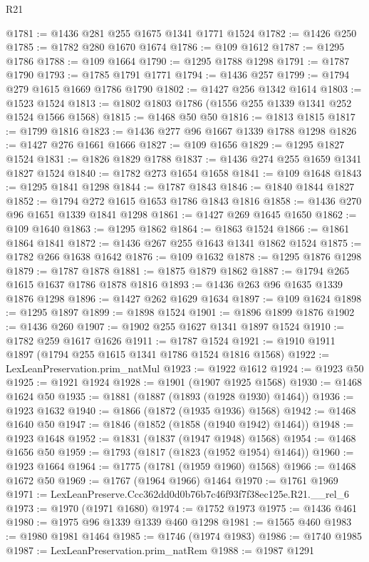 \begin{lexlean}{R21}
\begin{coremodule}
@1781 := @1436 @281 @255 @1675 @1341 @1771 @1524
@1782 := @1426 @250
@1785 := @1782 @280 @1670 @1674
@1786 := @109 @1612
@1787 := @1295 @1786
@1788 := @109 @1664
@1790 := @1295 @1788 @1298
@1791 := @1787 @1790
@1793 := @1785 @1791 @1771
@1794 := @1436 @257
@1799 := @1794 @279 @1615 @1669 @1786 @1790
@1802 := @1427 @256 @1342 @1614
@1803 := @1523 @1524
@1813 := @1802 @1803 @1786 (@1556 @255 @1339 @1341 @252 @1524 @1566 @1568)
@1815 := @1468 @50 @50
@1816 := @1813 @1815
@1817 := @1799 @1816
@1823 := @1436 @277 @96 @1667 @1339 @1788 @1298
@1826 := @1427 @276 @1661 @1666
@1827 := @109 @1656
@1829 := @1295 @1827 @1524
@1831 := @1826 @1829 @1788
@1837 := @1436 @274 @255 @1659 @1341 @1827 @1524
@1840 := @1782 @273 @1654 @1658
@1841 := @109 @1648
@1843 := @1295 @1841 @1298
@1844 := @1787 @1843
@1846 := @1840 @1844 @1827
@1852 := @1794 @272 @1615 @1653 @1786 @1843 @1816
@1858 := @1436 @270 @96 @1651 @1339 @1841 @1298
@1861 := @1427 @269 @1645 @1650
@1862 := @109 @1640
@1863 := @1295 @1862
@1864 := @1863 @1524
@1866 := @1861 @1864 @1841
@1872 := @1436 @267 @255 @1643 @1341 @1862 @1524
@1875 := @1782 @266 @1638 @1642
@1876 := @109 @1632
@1878 := @1295 @1876 @1298
@1879 := @1787 @1878
@1881 := @1875 @1879 @1862
@1887 := @1794 @265 @1615 @1637 @1786 @1878 @1816
@1893 := @1436 @263 @96 @1635 @1339 @1876 @1298
@1896 := @1427 @262 @1629 @1634
@1897 := @109 @1624
@1898 := @1295 @1897
@1899 := @1898 @1524
@1901 := @1896 @1899 @1876
@1902 := @1436 @260
@1907 := @1902 @255 @1627 @1341 @1897 @1524
@1910 := @1782 @259 @1617 @1626
@1911 := @1787 @1524
@1921 := @1910 @1911 @1897 (@1794 @255 @1615 @1341 @1786 @1524 @1816 @1568)
@1922 := LexLeanPreservation.prim_natMul
@1923 := @1922 @1612
@1924 := @1923 @50
@1925 := @1921 @1924
@1928 := @1901 (@1907 @1925 @1568)
@1930 := @1468 @1624 @50
@1935 := @1881 (@1887 (@1893 (@1928 @1930) @1464))
@1936 := @1923 @1632
@1940 := @1866 (@1872 (@1935 @1936) @1568)
@1942 := @1468 @1640 @50
@1947 := @1846 (@1852 (@1858 (@1940 @1942) @1464))
@1948 := @1923 @1648
@1952 := @1831 (@1837 (@1947 @1948) @1568)
@1954 := @1468 @1656 @50
@1959 := @1793 (@1817 (@1823 (@1952 @1954) @1464))
@1960 := @1923 @1664
@1964 := @1775 (@1781 (@1959 @1960) @1568)
@1966 := @1468 @1672 @50
@1969 := @1767 (@1964 @1966) @1464
@1970 := @1761 @1969
@1971 := LexLeanPreserve.Ccc362dd0d0b76b7c46f93f7f38ec125e.R21.__rel_6
@1973 := @1970 (@1971 @1680)
@1974 := @1752 @1973
@1975 := @1436 @461
@1980 := @1975 @96 @1339 @1339 @460 @1298
@1981 := @1565 @460
@1983 := @1980 @1981 @1464
@1985 := @1746 (@1974 @1983)
@1986 := @1740 @1985
@1987 := LexLeanPreservation.prim_natRem
@1988 := @1987 @1291

\end{coremodule}
\end{lexlean}
